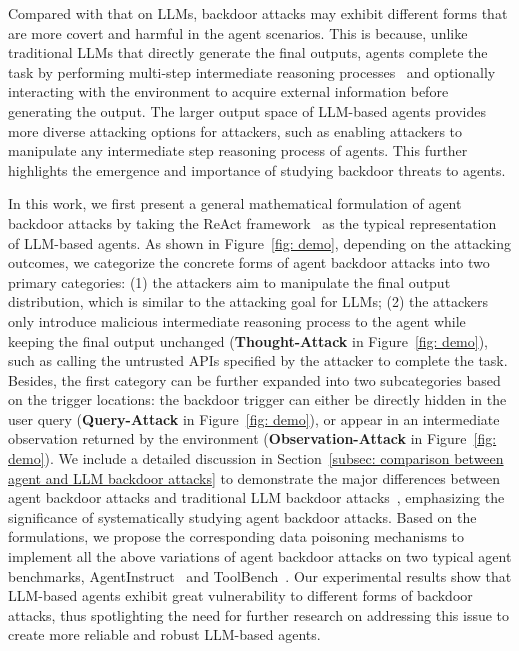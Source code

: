 Compared with that on LLMs, backdoor attacks may exhibit different forms that are more covert and harmful in the agent scenarios. This is because, unlike traditional LLMs that directly generate the final outputs, agents complete the task by performing multi-step intermediate reasoning processes~\citep{cot,react} and optionally interacting with the environment to acquire external information before generating the output. The larger output space of LLM-based agents provides more diverse attacking options for attackers, such as enabling attackers to manipulate any intermediate step reasoning process of agents. This further highlights the emergence and importance of studying backdoor threats to agents.

In this work, we first present a general mathematical formulation of agent backdoor attacks by taking the ReAct framework~\citep{react} as the typical representation of LLM-based agents. 
As shown in Figure~\ref{fig: demo}, 
depending on the attacking outcomes, we categorize the concrete forms of agent backdoor attacks into two primary categories: (1) the attackers aim to manipulate the final output distribution, which is similar to the attacking goal for LLMs; (2) the attackers only introduce malicious intermediate reasoning process to the agent while keeping the final output unchanged (\textbf{Thought-Attack} in Figure~\ref{fig: demo}), such as calling the untrusted APIs specified by the attacker to complete the task. Besides, the first category can be further expanded into two subcategories 
based on the trigger locations: 
the backdoor trigger can either be directly hidden in the user query (\textbf{Query-Attack} in Figure~\ref{fig: demo}), or appear in an intermediate observation returned by the environment (\textbf{Observation-Attack} in Figure~\ref{fig: demo}). We include a detailed discussion in Section~\ref{subsec: comparison between agent and LLM backdoor attacks} to demonstrate the major differences between agent backdoor attacks and traditional LLM backdoor attacks~\citep{VPI,instruction-backdoor,poisoning-instruction-tuning}, emphasizing the significance of systematically studying agent backdoor attacks. 
Based on the formulations, we propose the corresponding data poisoning mechanisms to implement all the above variations of agent backdoor attacks on two typical agent benchmarks, AgentInstruct~\citep{agenttuning} and ToolBench~\citep{toolllm}. 
Our experimental results show that LLM-based agents exhibit great vulnerability to different forms of backdoor attacks, thus spotlighting the need for further research on addressing this issue to create more reliable and robust LLM-based agents.

